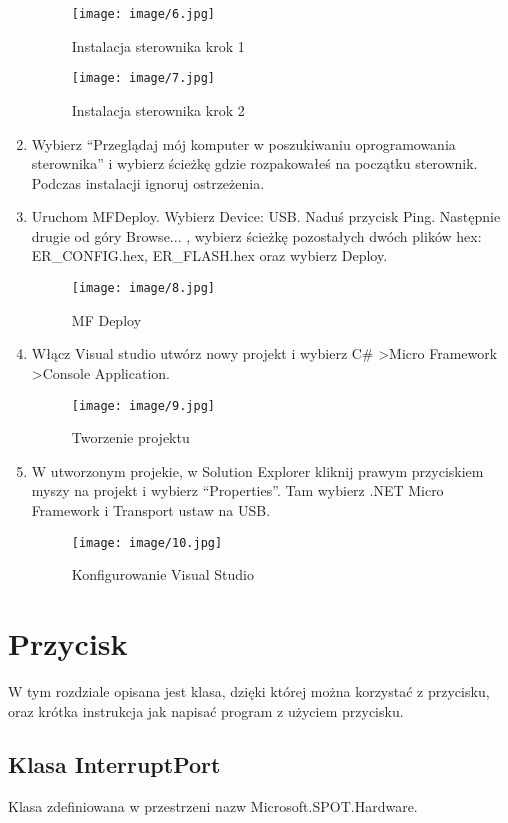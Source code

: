 \documentclass{article}
\begin{document}
\begin{enumerate}
\begin{figure}[H]
\texttt{[image: image/6.jpg]}
\caption{Instalacja sterownika krok 1}
\end{figure}
\begin{figure}[H]
\texttt{[image: image/7.jpg]}
\caption{Instalacja sterownika krok 2}
\end{figure}

\item Wybierz “Przeglądaj mój komputer w poszukiwaniu oprogramowania sterownika” i wybierz ścieżkę gdzie rozpakowałeś na początku sterownik. Podczas instalacji ignoruj ostrzeżenia.
\item Uruchom MFDeploy. Wybierz Device: USB. Naduś przycisk Ping. Następnie drugie od góry Browse... , wybierz ścieżkę pozostałych dwóch plików hex: ER\_CONFIG.hex, ER\_FLASH.hex oraz wybierz Deploy.

\begin{figure}[H]
\texttt{[image: image/8.jpg]}
\caption{MF Deploy}
\end{figure}
\item Włącz Visual studio utwórz nowy projekt i wybierz C\# \textgreater Micro Framework \textgreater Console Application.

\begin{figure}[H]
\texttt{[image: image/9.jpg]}
\caption{Tworzenie projektu}
\end{figure}
\item W utworzonym projekie, w Solution Explorer kliknij prawym przyciskiem myszy na projekt i wybierz “Properties”. Tam wybierz .NET Micro Framework i Transport ustaw na USB.

\begin{figure}[H]
\texttt{[image: image/10.jpg]}
\caption{Konfigurowanie Visual Studio}
\end{figure}
\end{enumerate}

\section{Przycisk}
W tym rozdziale opisana jest klasa, dzięki której można korzystać z przycisku, oraz krótka instrukcja jak napisać program z użyciem przycisku.
\subsection{Klasa InterruptPort}
Klasa zdefiniowana w przestrzeni nazw Microsoft.SPOT.Hardware.
\end{document}

